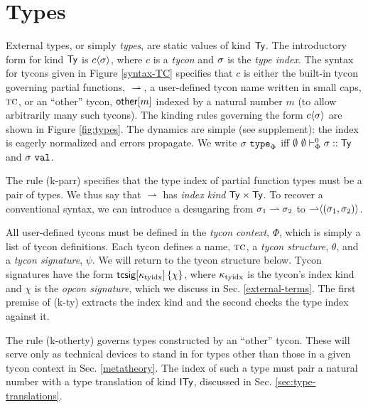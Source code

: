 \documentclass[10pt,preprint]{sigplanconf}
\newcommand{\rulename}[1]{(#1)}
\begin{document}
\section{Types}\label{types}


External types, or simply \emph{types}, are static values of kind ${\sf Ty}$. The introductory form for kind ${\sf Ty}$ is ${c}\langle\sigma\rangle$, where $c$ is a \emph{tycon} and $\sigma$ is the \emph{type index}. The syntax  for tycons given in Figure \ref{syntax-TC} specifies that $c$ is either the built-in tycon governing partial functions, $\rightharpoonup$, a user-defined tycon name written in small caps, $\textsc{tc}$, or an ``other'' tycon, ${\sf other}[m]$ indexed by a natural number $m$ (to allow arbitrarily many such tycons). The kinding rules governing the form ${c}\langle\sigma\rangle$ are shown in Figure \ref{fig:types}. The dynamics are simple (see supplement): the index is eagerly normalized and errors propagate. We write $\sigma~\texttt{type}_{\Phi}$  iff $\emptyset~\emptyset \vdash_{\Phi}^{0} \sigma :: {\sf Ty}$ and $\sigma~\mathtt{val}$. 

The rule \rulename{k-parr} specifies that the type index of partial function types must be a pair of types. We thus say that $\rightharpoonup$ has \emph{index kind} ${\sf Ty} \times {\sf Ty}$. To recover a conventional syntax, we can introduce a desugaring from $\sigma_1 \rightharpoonup \sigma_2$ to ${\rightharpoonup}\langle(\sigma_1, \sigma_2)\rangle$. %


All user-defined tycons must be defined in the \emph{tycon context}, $\Phi$, which is simply a list of tycon definitions. Each tycon defines a name, $\textsc{tc}$, a \emph{tycon structure}, $\theta$, and a \emph{tycon signature}, $\psi$. We will return to the tycon structure below. Tycon signatures have the form ${\sf tcsig}[\kappa_\text{tyidx}]\,\{\chi\}$, where $\kappa_\text{tyidx}$ is the tycon's index kind and $\chi$ is the \emph{opcon signature}, which we   discuss in Sec. \ref{external-terms}. The first premise of \rulename{k-ty} extracts the index kind and the second checks the type index against it. 

The rule (k-otherty) governs types constructed by an ``other'' tycon. These will serve only as technical devices to stand in for types other than those in a given tycon context in Sec. \ref{metatheory}. The index of such a type must pair a natural number with a type translation of kind ${\sf ITy}$, discussed in Sec. \ref{sec:type-translations}.
\end{document}

